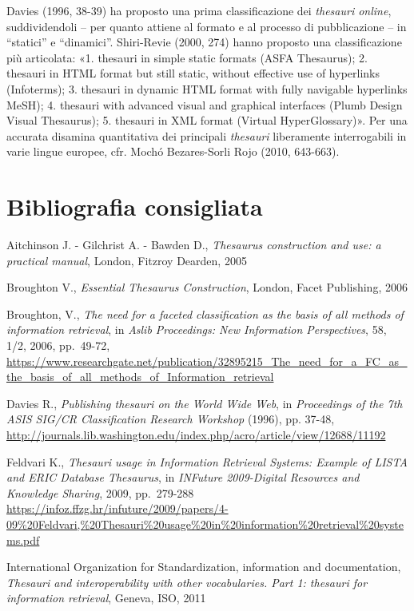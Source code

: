 \documentclass[
  b5paper,
  twoside,
  12pt,
  chapterprefix=false,
  bibliography=totocnumbered,
  parskip=false]{scrbook}
\begin{document}
Davies (1996, 38-39) ha proposto una prima classificazione dei \emph{thesauri
online}, suddividendoli -- per quanto attiene al formato e al processo
di pubblicazione -- in \enquote{statici} e \enquote{dinamici}. Shiri-Revie (2000, 274)
hanno proposto una classificazione più articolata: «1. thesauri in
simple static formats (ASFA Thesaurus); 2. thesauri in HTML format but
still static, without effective use of hyperlinks (Infoterms); 3.
thesauri in dynamic HTML format with fully navigable hyperlinks MeSH);
4. thesauri with advanced visual and graphical interfaces (Plumb Design
Visual Thesaurus); 5. thesauri in XML format (Virtual HyperGlossary)».
Per una accurata disamina quantitativa dei principali \emph{thesauri}
liberamente interrogabili in varie lingue europee, cfr. Mochó
Bezares-Sorli Rojo (2010, 643-663).

\hypertarget{bibliografia-consigliata-25}{%
\section*{Bibliografia consigliata}\label{bibliografia-consigliata-25}}

Aitchinson J. - Gilchrist A. - Bawden D., \emph{Thesaurus construction and
use: a practical manual}, London, Fitzroy Dearden, 2005

Broughton V., \emph{Essential Thesaurus Construction}, London, Facet
Publishing, 2006

Broughton, V., \emph{The need for a faceted classification as the basis of
all methods of information retrieval}, in \emph{Aslib Proceedings: New
Information Perspectives}, 58, 1/2, 2006, pp.~49-72,
\url{https://www.researchgate.net/publication/32895215_The_need_for_a_FC_as_the_basis_of_all_methods_of_Information_retrieval}

Davies R., \emph{Publishing thesauri on the World Wide Web}, in \emph{Proceedings
of the 7th ASIS SIG/CR Classification Research Workshop} (1996), pp.
37-48,
\url{http://journals.lib.washington.edu/index.php/acro/article/view/12688/11192}

Feldvari K., \emph{Thesauri usage in Information Retrieval Systems: Example
of LISTA and ERIC Database Thesaurus}, in \emph{INFuture 2009-Digital
Resources and Knowledge Sharing}, 2009, pp.~279-288
\url{https://infoz.ffzg.hr/infuture/2009/papers/4-09\%20Feldvari,\%20Thesauri\%20usage\%20in\%20information\%20retrieval\%20systems.pdf}

International Organization for Standardization, information and
documentation, \emph{Thesauri and interoperability with other vocabularies.
Part 1: thesauri for information retrieval}, Geneva, ISO, 2011
\end{document}
